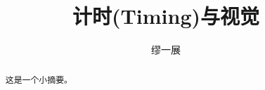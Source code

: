 \documentclass[a4paper, 12pt]{article}
\title{计时(Timing)与视觉}
\author{缪一展}
\date{}
\begin{document}
%



\maketitle
\begin{abstract}
    这是一个小摘要。
\end{abstract}









%
%
\end{document}
